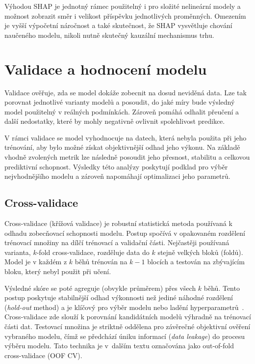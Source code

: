 Výhodou SHAP je jednotný rámec použitelný i pro složité nelineární modely a možnost zobrazit směr i velikost příspěvku jednotlivých proměnných. Omezením je vyšší výpočetní náročnost a také skutečnost, že SHAP vysvětluje chování
naučeného modelu, nikoli nutně skutečný kauzální mechanismus trhu.

\section{Validace a hodnocení modelu}

Validace ověřuje, zda se model dokáže zobecnit na dosud neviděná data. Lze tak porovnat jednotlivé varianty modelů a posoudit, do jaké míry bude výsledný model použitelný v reálných podmínkách. Zároveň pomáhá odhalit přeučení a další nedostatky, které by mohly negativně ovlivnit spolehlivost predikce.

V rámci validace se model vyhodnocuje na datech, která nebyla použita při jeho trénování, aby bylo možné získat objektivnější odhad jeho výkonu. Na základě vhodně zvolených metrik lze následně posoudit jeho přesnost, stabilitu a celkovou prediktivní schopnost. Výsledky této analýzy poskytují podklad pro výběr nejvhodnějšího modelu a zároveň napomáhají optimalizaci jeho parametrů.

\subsection*{Cross-validace}
\label{subsec:cross_validation_theory}

Cross-validace (křížová validace) je robustní statistická metoda používaná k odhadu zobecňovací schopnosti modelu. Postup spočívá v opakovaném rozdělení trénovací množiny na dílčí trénovací a validační části. Nejčastěji používaná varianta, $k$-fold cross-validace, rozděluje data do $k$ stejně velkých bloků (foldů). Model je v každém z $k$ běhů trénován na $k-1$ blocích a testován na zbývajícím bloku, který nebyl použit při učení.



Výsledné skóre se poté agreguje (obvykle průměrem) přes všech $k$ běhů. Tento postup poskytuje stabilnější odhad výkonnosti než jediné náhodné rozdělení (\textit{hold-out} method) a je klíčový pro výběr modelu nebo ladění hyperparametrů~\cite{Stone1974CrossValidation,Kohavi1995CrossValidation}. Cross-validace zde slouží k porovnání kandidátních modelů výhradně na trénovací části dat. Testovací množina je striktně oddělena pro závěrečné objektivní ověření vybraného modelu, čímž se předchází úniku informací (\textit{data leakage}) do procesu výběru modelu. Tato technika je v~dalším textu označována jako out-of-fold cross-validace (OOF CV).

